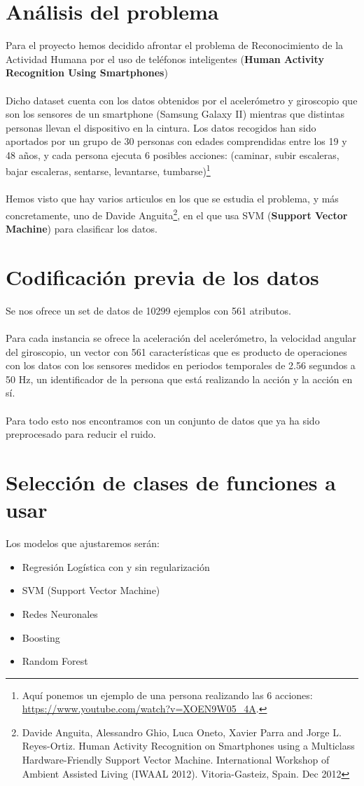 \documentclass[a4paper,openright,12pt]{article}
\begin{document}
\section{Análisis del problema}
Para el proyecto hemos decidido afrontar el problema de Reconocimiento de la Actividad Humana por el uso de teléfonos inteligentes (\textbf{Human Activity Recognition Using Smartphones})\\\\
Dicho dataset cuenta con los datos obtenidos por el acelerómetro y giroscopio que son los sensores de un smartphone (Samsung Galaxy II) mientras que distintas personas llevan el dispositivo en la cintura. Los datos recogidos han sido aportados por un grupo de 30 personas con edades comprendidas entre los 19 y 48 años, y cada persona ejecuta 6 posibles acciones: (caminar, subir escaleras, bajar escaleras, sentarse, levantarse, tumbarse)\footnote{Aquí ponemos un ejemplo de una persona realizando las 6 acciones: \url{https://www.youtube.com/watch?v=XOEN9W05_4A}.} \\\\ 
Hemos visto que hay varios articulos en los que se estudia el problema, y más concretamente, uno de Davide Anguita\footnote{ Davide Anguita, Alessandro Ghio, Luca Oneto, Xavier Parra and Jorge L. Reyes-Ortiz. Human Activity Recognition on Smartphones using a Multiclass Hardware-Friendly Support Vector Machine. International Workshop of Ambient Assisted Living (IWAAL 2012). Vitoria-Gasteiz, Spain. Dec 2012}, en el que usa SVM (\textbf{Support Vector Machine}) para clasificar los datos.
\section{Codificación previa de los datos}
Se nos ofrece un set de datos de 10299 ejemplos con 561 atributos.\\\\
Para cada instancia se ofrece la aceleración del acelerómetro, la velocidad angular del giroscopio, un vector con 561 características que es producto de operaciones con los datos con los sensores medidos en periodos temporales de 2.56 segundos a 50 Hz, un identificador de la persona que está realizando la acción y la acción en sí.
\\\\
Para todo esto nos encontramos con un conjunto de datos que ya ha sido preprocesado para reducir el ruido. 
\newpage

\section{Selección de clases de funciones a usar}
Los modelos que ajustaremos serán:
\begin{itemize}
\item Regresión Logística con y sin regularización
\item SVM (Support Vector Machine)
\item Redes Neuronales
\item Boosting
\item Random Forest
\end{itemize}
\end{document}

